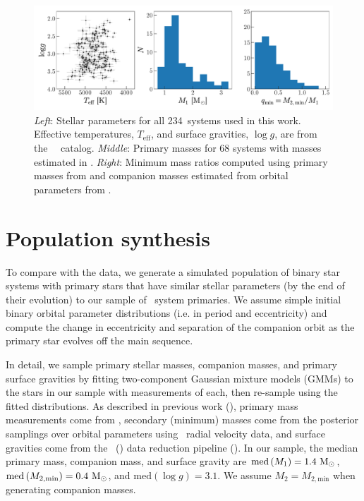 \documentclass[modern, letterpaper]{aastex62}
\newcommand{\apogee}{\project{\acronym{APOGEE}}}
\newcommand{\DR}{\acronym{DR14}}
\newcommand{\logg}{\ensuremath{\log g}}
\newcommand{\Teff}{\ensuremath{T_{\textrm{eff}}}}
\newcommand{\med}[1]{\ensuremath{\textrm{med}\left(#1\right)}}
\newcommand{\nclean}{234}
\begin{document}
\begin{figure}[h]
\begin{center}
\includegraphics[width=\textwidth]{logg-teff-m1}
\end{center}
\caption{%
\textit{Left}: Stellar parameters for all \nclean\ systems used in this work.
Effective temperatures, \Teff, and surface gravities, \logg, are from the
\apogee\ \DR\ catalog.
\textit{Middle}: Primary masses for 68 systems with masses estimated in
\cite{Ness:2015}.
\textit{Right}: Minimum mass ratios computed using primary masses from
\cite{Ness:2015} and companion masses estimated from orbital parameters from
\cite{Price-Whelan:2018}.
\label{fig:apogee}
}
\end{figure}


\section{Population synthesis}
\label{sec:theory}

To compare with the data, we generate a simulated population of binary star
systems with primary stars that have similar stellar parameters (by the end of
their evolution) to our sample of \apogee\ system primaries.
We assume simple initial binary orbital parameter distributions (i.e. in period
and eccentricity) and compute the change in eccentricity and separation of the
companion orbit as the primary star evolves off the main sequence.

In detail, we sample primary stellar masses, companion masses, and primary
surface gravities by fitting two-component Gaussian mixture models (GMMs) to the
stars in our sample with measurements of each, then re-sample using the fitted
distributions.
As described in previous work (\citealt{Price-Whelan:2018}), primary mass
measurements come from \cite{Ness:2015}, secondary (minimum) masses come from
the posterior samplings over orbital parameters using \apogee\ radial velocity
data, and surface gravities come from the \apogee\ (\DR) data reduction pipeline
(\citealt{Garcia-Perez:2016}).
In our sample, the median primary mass, companion mass, and surface gravity are
$\med{M_1} = 1.4~\msun$, $\med{M_{2, \textrm{min}}} = 0.4~\msun$, and
$\med{\logg} = 3.1$.
We assume $M_2 = M_{2, \textrm{min}}$ when generating companion masses.
\end{document}
